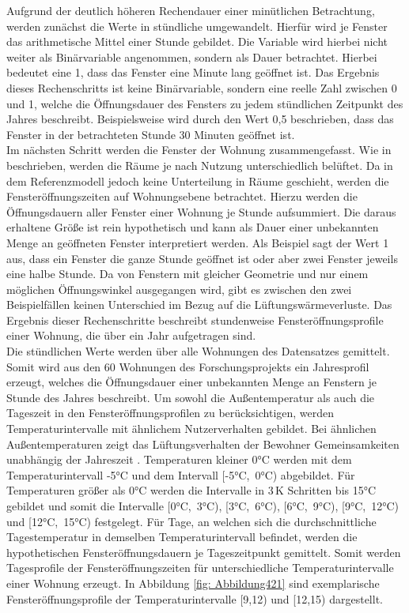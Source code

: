 Aufgrund der deutlich höheren Rechendauer einer minütlichen Betrachtung, werden zunächst die Werte in stündliche umgewandelt. 
Hierfür wird je Fenster das arithmetische Mittel einer Stunde gebildet.
Die Variable wird hierbei nicht weiter als Binärvariable angenommen, sondern als Dauer betrachtet.
Hierbei bedeutet eine 1, dass das Fenster eine Minute lang geöffnet ist.
Das Ergebnis dieses Rechenschritts ist keine Binärvariable, sondern eine reelle Zahl zwischen 0 und 1, welche die Öffnungsdauer des Fensters zu jedem stündlichen Zeitpunkt des Jahres beschreibt.
Beispielsweise wird durch den Wert 0,5 beschrieben, dass das Fenster in der betrachteten Stunde 30 Minuten geöffnet ist.\\
Im nächsten Schritt werden die Fenster der Wohnung zusammengefasst.
Wie in \cite{Osterhage.2018} beschrieben, werden die Räume je nach Nutzung unterschiedlich belüftet.
Da in dem Referenzmodell jedoch keine Unterteilung in Räume geschieht, werden die Fensteröffnungszeiten auf Wohnungsebene betrachtet.
Hierzu werden die Öffnungsdauern aller Fenster einer Wohnung je Stunde aufsummiert.
Die daraus erhaltene Größe ist rein hypothetisch und kann als Dauer einer unbekannten Menge an geöffneten Fenster interpretiert werden.
Als Beispiel sagt der Wert 1 aus, dass ein Fenster die ganze Stunde geöffnet ist oder aber zwei Fenster jeweils eine halbe Stunde.
Da von Fenstern mit gleicher Geometrie und nur einem möglichen Öffnungswinkel ausgegangen wird, gibt es zwischen den zwei Beispielfällen keinen Unterschied im Bezug auf die Lüftungswärmeverluste.
Das Ergebnis dieser Rechenschritte beschreibt stundenweise Fensteröffnungsprofile einer Wohnung, die über ein Jahr aufgetragen sind.\\
Die stündlichen Werte werden über alle Wohnungen des Datensatzes gemittelt.
Somit wird aus den 60 Wohnungen des Forschungsprojekts ein Jahresprofil erzeugt, welches die Öffnungsdauer einer unbekannten Menge an Fenstern je Stunde des Jahres beschreibt.
Um sowohl die Außentemperatur als auch die Tageszeit in den Fensteröffnungsprofilen zu berücksichtigen, werden Temperaturintervalle mit ähnlichem Nutzerverhalten gebildet. 
Bei ähnlichen Außentemperaturen zeigt das Lüftungsverhalten der Bewohner Gemeinsamkeiten unabhängig der Jahreszeit \cite{Osterhage.2018}.
Temperaturen kleiner \mbox{0°C} werden mit dem Temperaturintervall \mbox{-5°C} und dem Intervall \mbox{[-5°C, 0°C)} abgebildet.
Für Temperaturen größer als \mbox{0°C} werden die Intervalle in 3\,K Schritten bis \mbox{15°C} gebildet und somit die Intervalle \mbox{[0°C, 3°C)}, \mbox{[3°C, 6°C)}, \mbox{[6°C, 9°C)}, \mbox{[9°C, 12°C)} und \mbox{[12°C, 15°C)} festgelegt.
Für Tage, an welchen sich die durchschnittliche Tagestemperatur in demselben Temperaturintervall befindet, werden die hypothetischen Fensteröffnungsdauern je Tageszeitpunkt gemittelt.
Somit werden Tagesprofile der Fensteröffnungszeiten für unterschiedliche Temperaturintervalle einer Wohnung erzeugt.
In Abbildung \ref{fig: Abbildung421} sind exemplarische Fensteröffnungsprofile der Temperaturintervalle [9,12) und [12,15) dargestellt.

